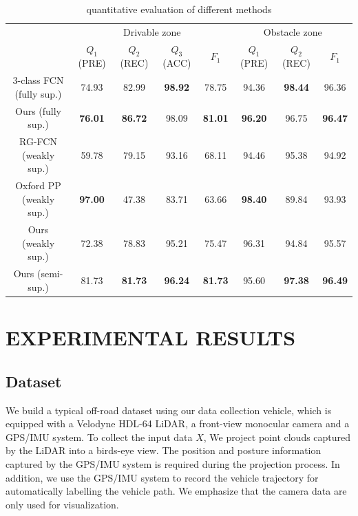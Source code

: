 \documentclass[letterpaper, 10 pt, conference]{ieeeconf}  %
\begin{document}
\begin{table}[b]
	\caption{quantitative evaluation of different methods}
	\label{tab:all_result}
	\centering
	\renewcommand{\arraystretch}{1.5}
	\begin{tabular}{c|cccc|ccc}
		\hline
		& \multicolumn{4}{c|}{Drivable zone}                                & \multicolumn{3}{c}{Obstacle zone}               \\ \cline{2-8} 
		& $Q_1$ (PRE)    & $Q_2$ (REC)    & $Q_3$ (ACC)    & $F_1$          & $Q_1$ (PRE)    & $Q_2$ (REC)    & $F_1$          \\ \hline
		3-class FCN (fully sup.) & 74.93          & 82.99          & \textbf{98.92} & 78.75          & 94.36          & \textbf{98.44} & 96.36          \\
		Ours (fully sup.)        & \textbf{76.01} & \textbf{86.72} & 98.09          & \textbf{81.01} & \textbf{96.20} & 96.75          & \textbf{96.47} \\ \hline
		RG-FCN (weakly sup.)     & 59.78          & {79.15}        & 93.16          & 68.11          & 94.46          & {95.38}        & 94.92          \\
		Oxford PP (weakly sup.)  & \textbf{97.00} & 47.38          & 83.71          & 63.66          & \textbf{98.40} & 89.84          & 93.93          \\
		Ours (weakly sup.)       & 72.38          & 78.83          & {95.21}        & {75.47}        & {96.31}        & 94.84          & {95.57}        \\
		Ours (semi-sup.)         & {81.73}        & \textbf{81.73} & \textbf{96.24} & \textbf{81.73} & 95.60          & \textbf{97.38} & \textbf{96.49} \\ \hline
	\end{tabular}
\end{table}

\section{EXPERIMENTAL RESULTS}	\label{sec:experiment}

\subsection{Dataset}
We build a typical off-road dataset using our data collection vehicle, which is equipped with a Velodyne HDL-64 LiDAR, a front-view monocular camera and a GPS/IMU system. To collect the input data $X$, We project point clouds captured by the LiDAR into a birds-eye view. The position and posture information captured by the GPS/IMU system is required during the projection process. In addition, we use the GPS/IMU system to record the vehicle trajectory for automatically labelling the vehicle path. We emphasize that the camera data are only used for visualization.
\end{document}
